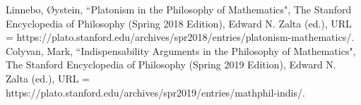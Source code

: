 \documentclass[10pt,letterpaper]{amsart}
\numberwithin{equation}{section}
\theoremstyle{plain}
\theoremstyle{definition}
\numberwithin{equation}{section}
\begin{document}
\begin{thebibliography}{99}
\bibitem{} Linnebo, Øystein, ``Platonism in the Philosophy of Mathematics", The Stanford Encyclopedia of Philosophy (Spring 2018 Edition), Edward N. Zalta (ed.), URL = https://plato.stanford.edu/archives/spr2018/entries/platonism-mathematics/. \\

\bibitem{} Colyvan, Mark, ``Indispensability Arguments in the Philosophy of Mathematics", The Stanford Encyclopedia of Philosophy (Spring 2019 Edition), Edward N. Zalta (ed.), URL = https://plato.stanford.edu/archives/spr2019/entries/mathphil-indis/. \\

\end{thebibliography}
\end{document}
